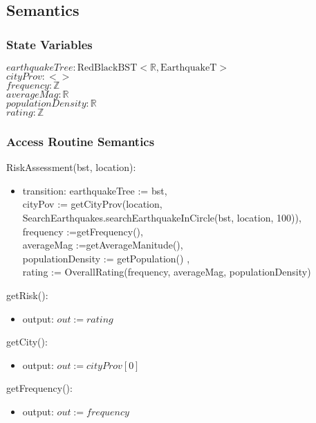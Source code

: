 \documentclass[12pt]{article}
\begin{document}
\subsection* {Semantics}

\subsubsection* {State Variables}

$\mathit{earthquakeTree} : \mbox{RedBlackBST}<\mathbb{R}, \mbox{EarthquakeT}>$ \\
$\mathit{cityProv} : <>$ \\
$\mathit{frequency} : \mathbb{Z}$ \\
$\mathit{averageMag} : \mathbb{R}$ \\
$\mathit{populationDensity} : \mathbb{R}$ \\
$\mathit{rating} : \mathbb{Z}$


\subsubsection* {Access Routine Semantics}

\noindent RiskAssessment(bst, location):
\begin{itemize}
\item transition: earthquakeTree := bst,\\
 cityPov := getCityProv(location, SearchEarthquakes.searchEarthquakeInCircle(bst, location, 100)),\\
 frequency :=getFrequency(), \\
 averageMag :=getAverageManitude(), \\
 populationDensity :=    getPopulation() ,\\ 
 rating := OverallRating(frequency, averageMag, populationDensity) \\
\end{itemize}

\noindent getRisk():
\begin{itemize}
\item output: $\mathit{out} := rating$
\end{itemize}


\noindent getCity():
\begin{itemize}
\item output: $\mathit{out} := cityProv[0]$ 
\end{itemize}

\noindent getFrequency():
\begin{itemize}
\item output: $\mathit{out} := frequency$ 
\end{itemize}
\end{document}
